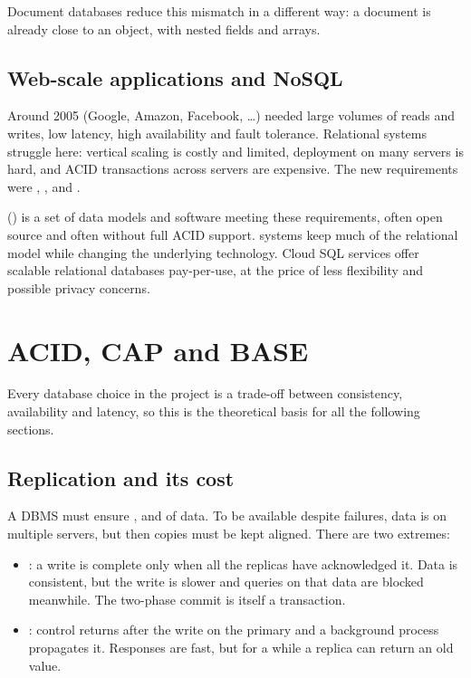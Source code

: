 \begin{remark}
Document databases reduce this mismatch in a different way: a document is already close to an object, with nested fields and arrays.
\end{remark}

\subsection{Web-scale applications and NoSQL}
Around 2005  (Google, Amazon, Facebook, \dots) needed large volumes of reads and writes, low latency, high availability and fault tolerance. Relational systems struggle here: vertical scaling is costly and limited, deployment on many servers is hard, and ACID transactions across servers are expensive. The new requirements were , ,  and .

 () is a set of data models and software meeting these requirements, often open source and often without full ACID support.  systems keep much of the relational model while changing the underlying technology. Cloud SQL services offer scalable relational databases pay-per-use, at the price of less flexibility and possible privacy concerns.

\section{ACID, CAP and BASE}\label{sec:acid}

Every database choice in the project is a trade-off between consistency, availability and latency, so this is the theoretical basis for all the following sections.

\subsection{Replication and its cost}
A DBMS must ensure ,  and  of data. To be available despite failures, data is  on multiple servers, but then copies must be kept aligned. There are two extremes:
\begin{itemize}
  \item {}: a write is complete only when all the replicas have acknowledged it. Data is consistent, but the write is slower and queries on that data are blocked meanwhile. The two-phase commit is itself a transaction.
  \item {}: control returns after the write on the primary and a background process propagates it. Responses are fast, but for a while a replica can return an old value.
\end{itemize}

